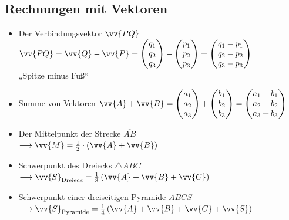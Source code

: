 \subsection{Rechnungen mit Vektoren}
\begin{itemize}
\item Der Verbindungsvektor $\vv{PQ}$ \\ $\vv{PQ} = \vv{Q} - \vv{P} = \begin{pmatrix} q_1 \\ q_2 \\ q_3 \end{pmatrix} - \begin{pmatrix} p_1 \\ p_2 \\ p_3 \end{pmatrix} = \begin{pmatrix} q_1 - p_1\\ q_2 - p_2\\ q_3 - p_3\end{pmatrix}$ \\ \mynote „Spitze minus Fuß“
\item Summe von Vektoren $\vv{A} +\vv{B} =  \begin{pmatrix} a_1 \\ a_2 \\ a_3 \end{pmatrix} + \begin{pmatrix} b_1 \\ b_2 \\ b_3 \end{pmatrix} = \begin{pmatrix} a_1 + b_1\\ a_2 + b_2\\ a_3 + b_3\end{pmatrix}$
\item Der Mittelpunkt der Strecke $\overline{AB}$  \\$ \longrightarrow \vv{M} = \frac{1}{2}\cdot \left(\vv{A} + \vv{B}\right)$ 
\item Schwerpunkt des Dreiecks $\triangle ABC $\\ $\longrightarrow \vv{S}_{\text{Dreieck}} = \frac{1}{3} \left(\vv{A} + \vv{B} +\vv{C}\right)$
\item Schwerpunkt einer dreiseitigen Pyramide $ABCS$ \\ $\longrightarrow \vv{S}_{\text{Pyramide}}= \frac{1}{4} \left(\vv{A} + \vv{B} +\vv{C} +\vv{S}\right)$
\end{itemize}
